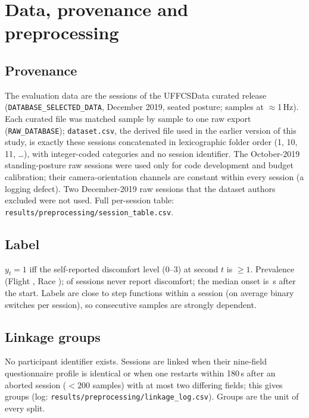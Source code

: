 \section{Data, provenance and preprocessing}
\label{sec:s-data}

\subsection{Provenance}
The evaluation data are the \nSessionsEval{} sessions of the UFFCSData curated release (\texttt{DATABASE\_SELECTED\_DATA}, December 2019, seated posture; \nSamplesEval{} samples at $\approx$1\,Hz). Each curated file was matched sample by sample to one raw export (\texttt{RAW\_DATABASE}); \texttt{dataset.csv}, the derived file used in the earlier version of this study, is exactly these sessions concatenated in lexicographic folder order (1, 10, 11, \ldots), with integer-coded categories and no session identifier. The \nSessionsDev{} October-2019 standing-posture raw sessions were used only for code development and budget calibration; their camera-orientation channels are constant within every session (a logging defect). Two December-2019 raw sessions that the dataset authors excluded were not used. Full per-session table: \texttt{results/\allowbreak preprocessing/\allowbreak session\_table.csv}.

\subsection{Label}
$y_t=1$ iff the self-reported discomfort level (0--3) at second $t$ is $\ge 1$. Prevalence \prevEval{} (Flight \prevFlight{}, Race \prevRace{}); \nNeverPos{} of \nSessionsEval{} sessions never report discomfort; the median onset is \onsetMedian\,s after the start. Labels are close to step functions within a session (on average \PHLabelBinaryChanges{} binary switches per session), so consecutive samples are strongly dependent.

\subsection{Linkage groups}
No participant identifier exists. Sessions are linked when their nine-field questionnaire profile is identical or when one restarts within 180\,s after an aborted session ($<200$ samples) with at most two differing fields; this gives \nGroupsEval{} groups (log: \texttt{results/\allowbreak preprocessing/\allowbreak linkage\_log.csv}). Groups are the unit of every split.

